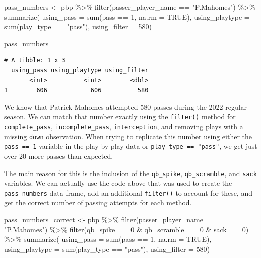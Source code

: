 \documentclass[
  letterpaper,
]{krantz}
\newenvironment{Shaded}{\begin{snugshade}}{\end{snugshade}}
\newcommand{\AttributeTok}[1]{\textcolor[rgb]{0.40,0.45,0.13}{#1}}
\newcommand{\ConstantTok}[1]{\textcolor[rgb]{0.56,0.35,0.01}{#1}}
\newcommand{\DecValTok}[1]{\textcolor[rgb]{0.68,0.00,0.00}{#1}}
\newcommand{\FunctionTok}[1]{\textcolor[rgb]{0.28,0.35,0.67}{#1}}
\newcommand{\NormalTok}[1]{\textcolor[rgb]{0.00,0.23,0.31}{#1}}
\newcommand{\OtherTok}[1]{\textcolor[rgb]{0.00,0.23,0.31}{#1}}
\newcommand{\SpecialCharTok}[1]{\textcolor[rgb]{0.37,0.37,0.37}{#1}}
\newcommand{\StringTok}[1]{\textcolor[rgb]{0.13,0.47,0.30}{#1}}
\begin{document}
\begin{tcolorbox}
\begin{Shaded}
\begin{Highlighting}[]
\NormalTok{pass\_numbers }\OtherTok{\textless{}{-}}\NormalTok{ pbp }\SpecialCharTok{\%\textgreater{}\%}
  \FunctionTok{filter}\NormalTok{(passer\_player\_name }\SpecialCharTok{==} \StringTok{"P.Mahomes"}\NormalTok{) }\SpecialCharTok{\%\textgreater{}\%}
  \FunctionTok{summarize}\NormalTok{(}
    \AttributeTok{using\_pass =} \FunctionTok{sum}\NormalTok{(pass }\SpecialCharTok{==} \DecValTok{1}\NormalTok{, }\AttributeTok{na.rm =} \ConstantTok{TRUE}\NormalTok{),}
    \AttributeTok{using\_playtype =} \FunctionTok{sum}\NormalTok{(play\_type }\SpecialCharTok{==} \StringTok{"pass"}\NormalTok{),}
    \AttributeTok{using\_filter =} \DecValTok{580}\NormalTok{)}

\NormalTok{pass\_numbers}
\end{Highlighting}
\end{Shaded}

\begin{verbatim}
# A tibble: 1 x 3
  using_pass using_playtype using_filter
       <int>          <int>        <dbl>
1        606            606          580
\end{verbatim}

We know that Patrick Mahomes attempted 580 passes during the 2022
regular season. We can match that number exactly using the
\texttt{filter()} method for \texttt{complete\_pass},
\texttt{incomplete\_pass}, \texttt{interception}, and removing plays
with a missing \texttt{down} observation. When trying to replicate this
number using either the \texttt{pass\ ==\ 1} variable in the
play-by-play data or \texttt{play\_type\ ==\ "pass"}, we get just over
20 more passes than expected.

The main reason for this is the inclusion of the \texttt{qb\_spike},
\texttt{qb\_scramble}, and \texttt{sack} variables. We can actually use
the code above that was used to create the \texttt{pass\_numbers} data
frame, add an additional \texttt{filter()} to account for these, and get
the correct number of passing attempts for each method.

\begin{Shaded}
\begin{Highlighting}[]
\NormalTok{pass\_numbers\_correct }\OtherTok{\textless{}{-}}\NormalTok{ pbp }\SpecialCharTok{\%\textgreater{}\%}
  \FunctionTok{filter}\NormalTok{(passer\_player\_name }\SpecialCharTok{==} \StringTok{"P.Mahomes"}\NormalTok{) }\SpecialCharTok{\%\textgreater{}\%}
  \FunctionTok{filter}\NormalTok{(qb\_spike }\SpecialCharTok{==} \DecValTok{0} \SpecialCharTok{\&}\NormalTok{ qb\_scramble }\SpecialCharTok{==} \DecValTok{0} \SpecialCharTok{\&}\NormalTok{ sack }\SpecialCharTok{==} \DecValTok{0}\NormalTok{) }\SpecialCharTok{\%\textgreater{}\%}
  \FunctionTok{summarize}\NormalTok{(}
    \AttributeTok{using\_pass =} \FunctionTok{sum}\NormalTok{(pass }\SpecialCharTok{==} \DecValTok{1}\NormalTok{, }\AttributeTok{na.rm =} \ConstantTok{TRUE}\NormalTok{),}
    \AttributeTok{using\_playtype =} \FunctionTok{sum}\NormalTok{(play\_type }\SpecialCharTok{==} \StringTok{"pass"}\NormalTok{),}
    \AttributeTok{using\_filter =} \DecValTok{580}\NormalTok{)}


\end{Highlighting}
\end{Shaded}
\end{tcolorbox}
\end{document}
